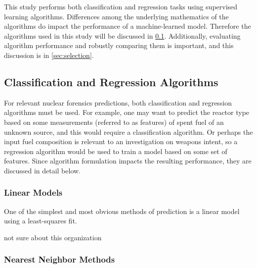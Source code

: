This study performs both classification and regression tasks using supervised
learning algorithms.  Differences among the underlying mathematics  of the algorithms do impact the performance of a machine-learned model.
Therefore the algorithms used in this study will be discussed in
\ref{sec:algs}. Additionally, evaluating algorithm performance and robustly
comparing them is important, and this discussion is in \ref{sec:selection}.

\subsection{Classification and Regression Algorithms}
\label{sec:algs}

For relevant nuclear forensics predictions, both classification and regression
algorithms must be used.  For example, one may want to predict the reactor type
based on some measurements (referred to as features) of spent fuel of an
unknown source, and this would require a classification algorithm. Or perhaps
the input fuel composition is relevant to an investigation on weapons intent,
so a regression algorithm would be used to train a model based on some set of
features.  Since algorithm formulation impacts the resulting performance, they
are discussed in detail below.  


\subsubsection{Linear Models}
\label{sec:linear}

One of the simplest and most obvious methods of prediction is a linear model using a least-squares 
fit. 





not sure about this organization

\subsubsection{Nearest Neighbor Methods}
\label{sec:neighbor}

